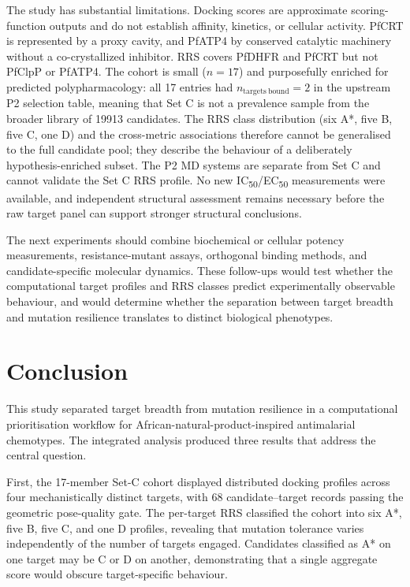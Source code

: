\documentclass[journal=jcisd8,manuscript=article]{achemso}
\begin{document}
The study has substantial limitations. Docking scores are approximate scoring-function outputs and do not establish affinity, kinetics, or cellular activity. PfCRT is represented by a proxy cavity, and PfATP4 by conserved catalytic machinery without a co-crystallized inhibitor. RRS covers PfDHFR and PfCRT but not PfClpP or PfATP4. The cohort is small ($n=\num{17}$) and purposefully enriched for predicted polypharmacology: all 17 entries had $n_{\mathrm{targets\ bound}}=2$ in the upstream P2 selection table, meaning that Set C is not a prevalence sample from the broader library of \num{19913} candidates. The RRS class distribution (six A*, five B, five C, one D) and the cross-metric associations therefore cannot be generalised to the full candidate pool; they describe the behaviour of a deliberately hypothesis-enriched subset. The P2 MD systems are separate from Set C and cannot validate the Set C RRS profile. No new IC\textsubscript{50}/EC\textsubscript{50} measurements were available, and independent structural assessment remains necessary before the raw target panel can support stronger structural conclusions.

The next experiments should combine biochemical or cellular potency measurements, resistance-mutant assays, orthogonal binding methods, and candidate-specific molecular dynamics. These follow-ups would test whether the computational target profiles and RRS classes predict experimentally observable behaviour, and would determine whether the separation between target breadth and mutation resilience translates to distinct biological phenotypes.

\section{Conclusion}
This study separated target breadth from mutation resilience in a computational prioritisation workflow for African-natural-product-inspired antimalarial chemotypes. The integrated analysis produced three results that address the central question.

First, the 17-member Set-C cohort displayed distributed docking profiles across four mechanistically distinct targets, with \num{68} candidate--target records passing the geometric pose-quality gate. The per-target RRS classified the cohort into six A*, five B, five C, and one D profiles, revealing that mutation tolerance varies independently of the number of targets engaged. Candidates classified as A* on one target may be C or D on another, demonstrating that a single aggregate score would obscure target-specific behaviour.
\end{document}
